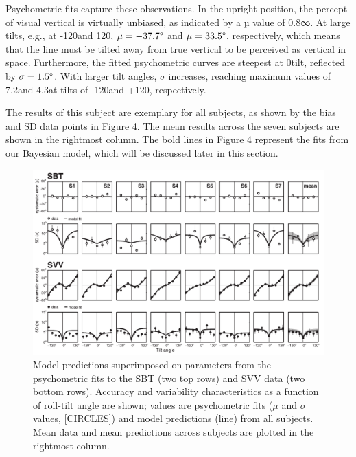 Psychometric fits capture these observations. In the upright position, the percept of visual vertical is virtually unbiased, as indicated by a µ value of 0.8∞. At large tilts, e.g., at -120\textdegree and 120\textdegree, $\mu = -37.7\degree$ and $\mu = 33.5\degree$, respectively, which means that the line must be tilted away from true vertical to be perceived as vertical in space. Furthermore, the fitted psychometric curves are steepest at 0\textdegree tilt, reflected by $\sigma = 1.5\degree$. With larger tilt angles, $\sigma$ increases, reaching maximum values of 7.2\textdegree and 4.3\textdegree at tilts of -120\textdegree and +120\textdegree, respectively. 

The results of this subject are exemplary for all subjects, as shown by the bias and SD data points in Figure 4. The mean results across the seven subjects are shown in the rightmost column. The bold lines in Figure 4 represent the fits from our Bayesian model, which will be discussed later in this section. 

\begin{figure}
	\includegraphics[width=1.0\textwidth]{src/paper1/figure4.pdf}
	
    \caption{Model predictions superimposed on parameters from the psychometric fits to the SBT (two top rows) and SVV data (two bottom rows). Accuracy and variability characteristics as a function of roll-tilt angle are shown; values are psychometric fits ($\mu$ and $\sigma$ values, [CIRCLES]) and model predictions (line) from all subjects. Mean data and mean predictions across subjects are plotted in the rightmost column.}
    \label{p1:fig4}
\end{figure}


